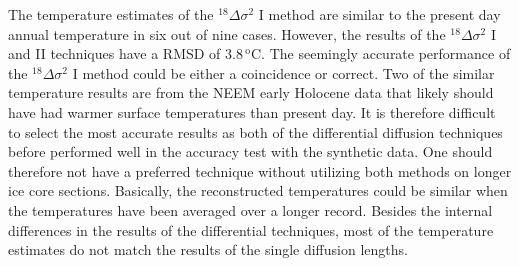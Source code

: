 \documentclass[11pt, draftcls, onecolumn]{IEEEtran} %
\numberwithin{equation}{section}
\numberwithin{table}{section}
\numberwithin{figure}{section}
\begin{document}
The temperature estimates of the ${}^{18}\Delta\sigma^2$ I method are similar to the present day annual temperature in six out of nine cases. 
However, the results of the ${}^{18}\Delta\sigma^2$ I and II techniques have a RMSD of $3.8\,^\mathrm{o}\mathrm{C}$.
The seemingly accurate performance of the ${}^{18}\Delta\sigma^2$ I method could be either a coincidence or correct. 
Two of the similar temperature results are from the NEEM early Holocene data that likely should have had warmer surface temperatures 
than present day.
It is therefore difficult to select the most accurate results as both of the differential diffusion techniques
before performed well in the accuracy test with the synthetic data.
One should therefore not have a preferred technique without utilizing both methods on longer ice core sections.
Basically, the reconstructed temperatures could be similar when the temperatures have been averaged over a longer record.
Besides the internal differences in the results of the differential techniques, most of the temperature estimates do not 
match the results of the single diffusion lengths.

\end{document}
